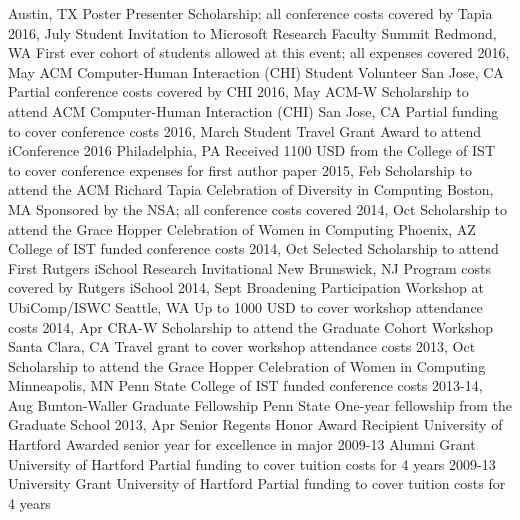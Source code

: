 \documentclass[]{cv-style}          %
\begin{document}
\begin{entrylist}
{}
{Austin, TX}
{Poster Presenter Scholarship; all conference costs covered by Tapia}
\entry
{2016, July}
{Student Invitation to Microsoft Research Faculty Summit
}
{Redmond, WA}
{First ever cohort of students allowed at this event; all expenses covered}
\entry
{2016, May}
{ACM Computer-Human Interaction (CHI) Student Volunteer
}
{San Jose, CA}
{Partial conference costs covered by CHI}
\entry
{2016, May}
{ACM-W Scholarship to attend ACM Computer-Human Interaction (CHI)
}
{San Jose, CA}
{Partial funding to cover conference costs}
\entry
{2016, March}
{Student Travel Grant Award to attend iConference 2016
}
{Philadelphia, PA}
{Received 1100 USD from the College of IST to cover conference expenses for first author paper}
\entry
{2015, Feb}
{Scholarship to attend the ACM Richard Tapia Celebration of Diversity in Computing
}
{Boston, MA}
{Sponsored by the NSA; all conference costs covered}
\entry
{2014, Oct}
{Scholarship to attend the Grace Hopper Celebration of Women in Computing
}
{Phoenix, AZ}
{College of IST funded conference costs}
\entry
{2014, Oct}
{Selected Scholarship to attend First Rutgers iSchool Research Invitational
}
{New Brunswick, NJ}
{Program costs covered by Rutgers iSchool}
\entry
{2014, Sept}
{Broadening Participation Workshop at UbiComp/ISWC
}
{Seattle, WA}
{Up to 1000 USD to cover workshop attendance costs}
\entry
{2014, Apr}
{CRA-W Scholarship to attend the Graduate Cohort Workshop
}
{Santa Clara, CA}
{Travel grant to cover workshop attendance costs}
\entry
{2013, Oct}
{Scholarship to attend the Grace Hopper Celebration of Women in Computing
}
{Minneapolis, MN}
{Penn State College of IST funded conference costs}
\entry
{2013-14, Aug}
{Bunton-Waller Graduate Fellowship
}
{Penn State}
{One-year fellowship from the Graduate School }
\entry
{2013, Apr}
{Senior Regents Honor Award Recipient
}
{University of Hartford}
{Awarded senior year for excellence in major}
\entry
{2009-13}
{Alumni Grant
}
{University of Hartford}
{Partial funding to cover tuition costs for 4 years}
\entry
{2009-13}
{University Grant
}
{University of Hartford}
{Partial funding to cover tuition costs for 4 years}
\end{entrylist}
\end{document}
